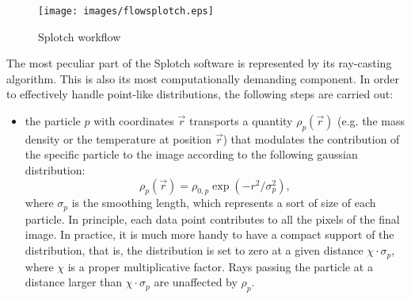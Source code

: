 \documentclass[11pt]{article}
\begin{document}
\begin{figure}
\centering
\texttt{[image: images/flowsplotch.eps]}
\caption{Splotch workflow}
\label{fig:workflow}
\end{figure}

The most peculiar part of the Splotch software is represented by its ray-casting algorithm.
This is also its most computationally demanding component.
In order to effectively handle point-like distributions, the following 
steps are carried out: 

\begin{itemize}
\item
the particle $p$ with coordinates $\vec r$ transports a quantity $\rho_p(\vec r)$ 
(e.g. the mass density or the temperature at position $\vec r$)
that modulates the contribution of the specific particle to the image
according to the following gaussian distribution: 
\begin{equation}\label{smooth}
\rho_p(\vec r)=\rho_{0,p}\exp(-r^2/\sigma_p^2),
\end{equation}
where $\sigma_p$ is the smoothing length, which represents
a sort of size of each particle.  
In principle, each data point contributes to all the pixels of the final image.
In practice, it is much more handy to have a compact support of the
distribution, that is, the distribution is set to zero at a given
distance $\chi\cdot\sigma_p$, where $\chi$ is a proper multiplicative factor.
Rays passing
the particle at a distance larger than $\chi\cdot\sigma_p$ are
unaffected by $\rho_p$.


\end{itemize}
\end{document}
